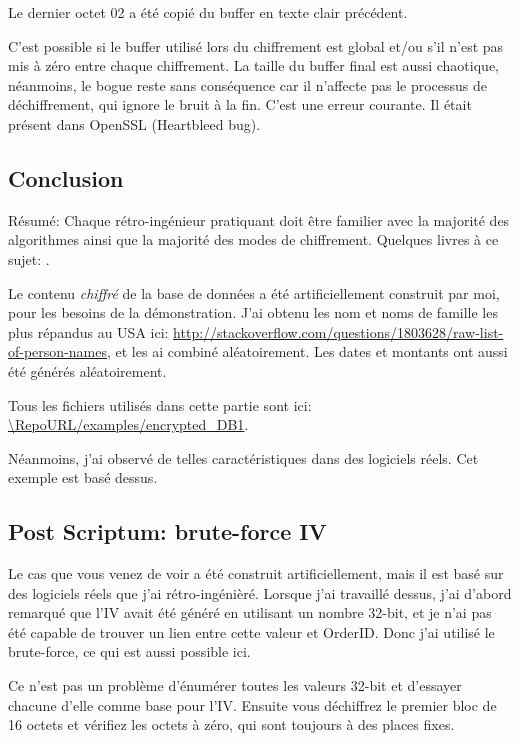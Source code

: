 Le dernier octet 02 a été copié du buffer en texte clair précédent.

C'est possible si le buffer utilisé lors du chiffrement est global et/ou s'il n'est
pas mis à zéro entre chaque chiffrement.
La taille du buffer final est aussi chaotique, néanmoins, le bogue reste sans conséquence
car il n'affecte pas le processus de déchiffrement, qui ignore le bruit à la fin.
C'est une erreur courante.
Il était présent dans OpenSSL (Heartbleed bug).

\subsection{Conclusion}

Résumé:
Chaque rétro-ingénieur pratiquant doit être familier avec la majorité des algorithmes
ainsi que la majorité des modes de chiffrement.
Quelques livres à ce sujet: .

Le contenu \emph{chiffré} de la base de données a été artificiellement construit
par moi, pour les besoins de la démonstration.
J'ai obtenu les nom et noms de famille les plus répandus au USA ici: \url{http://stackoverflow.com/questions/1803628/raw-list-of-person-names},
et les ai combiné aléatoirement.
Les dates et montants ont aussi été générés aléatoirement.

Tous les fichiers utilisés dans cette partie sont ici: \url{\RepoURL/examples/encrypted_DB1}.

Néanmoins, j'ai observé de telles caractéristiques dans des logiciels réels.
Cet exemple est basé dessus.

\subsection{Post Scriptum: brute-force \ac{IV}}

Le cas que vous venez de voir a été construit artificiellement, mais il est basé
sur des logiciels réels que j'ai rétro-ingénièré.
Lorsque j'ai travaillé dessus, j'ai d'abord remarqué que l'\ac{IV} avait été généré
en utilisant un nombre 32-bit, et je n'ai pas été capable de trouver un lien entre
cette valeur et OrderID.
Donc j'ai utilisé le brute-force, ce qui est aussi possible ici.

Ce n'est pas un problème d'énumérer toutes les valeurs 32-bit et d'essayer chacune
d'elle comme base pour l'\ac{IV}.
Ensuite vous déchiffrez le premier bloc de 16 octets et vérifiez les octets à zéro,
qui sont toujours à des places fixes.
